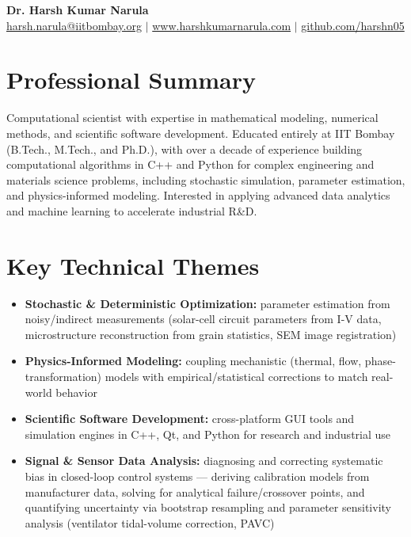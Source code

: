 \documentclass[10.5pt,a4paper]{article}
\newenvironment{tightitemize}
  {\begin{itemize}[leftmargin=1.2em,itemsep=1pt,topsep=2pt,parsep=0pt]}
  {\end{itemize}}
\begin{document}
\begin{center}
{\Large\bfseries Dr. Harsh Kumar Narula}\\[3pt]
\href{mailto:harsh.narula@iitbombay.org}{harsh.narula@iitbombay.org} \quad $\vert$ \quad
\href{https://www.harshkumarnarula.com}{www.harshkumarnarula.com} \quad $\vert$ \quad
\href{https://github.com/harshn05}{github.com/harshn05}
\end{center}

\vspace{4pt}

\section{Professional Summary}
Computational scientist with expertise in mathematical modeling, numerical methods, and scientific software development. Educated entirely at IIT Bombay (B.Tech., M.Tech., and Ph.D.), with over a decade of experience building computational algorithms in C++ and Python for complex engineering and materials science problems, including stochastic simulation, parameter estimation, and physics-informed modeling. Interested in applying advanced data analytics and machine learning to accelerate industrial R\&D.

\section{Key Technical Themes}
\begin{tightitemize}
\item \textbf{Stochastic \& Deterministic Optimization:} parameter estimation from noisy/indirect measurements (solar-cell circuit parameters from I-V data, microstructure reconstruction from grain statistics, SEM image registration)
\item \textbf{Physics-Informed Modeling:} coupling mechanistic (thermal, flow, phase-transformation) models with empirical/statistical corrections to match real-world behavior
\item \textbf{Scientific Software Development:} cross-platform GUI tools and simulation engines in C++, Qt, and Python for research and industrial use
\item \textbf{Signal \& Sensor Data Analysis:} diagnosing and correcting systematic bias in closed-loop control systems --- deriving calibration models from manufacturer data, solving for analytical failure/crossover points, and quantifying uncertainty via bootstrap resampling and parameter sensitivity analysis (ventilator tidal-volume correction, PAVC)
\end{tightitemize}
\end{document}
